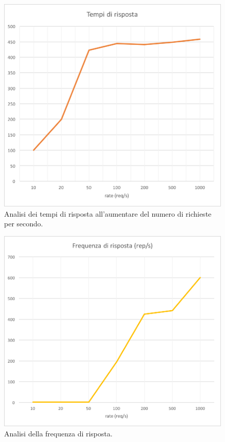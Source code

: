 \documentclass[italian]{tktltiki2}
\begin{document}
\begin{figure}[H]
\centering
\includegraphics[width=\textwidth]{images/reply_times}
\caption{Analisi dei tempi di risposta all'aumentare del numero di richieste per secondo.\label{fig: reply_times}}
\end{figure}
\begin{figure}[H]
\centering
\includegraphics[width=\textwidth]{images/reply_freq}
\caption{Analisi della frequenza di risposta.\label{fig: reply_freq}}
\end{figure}
\end{document}
